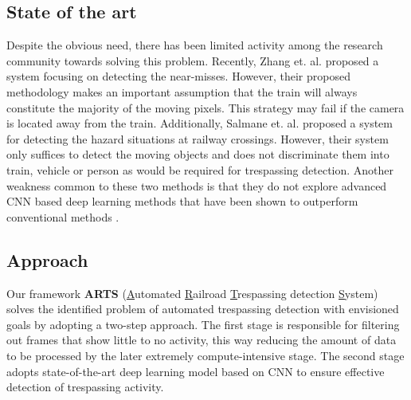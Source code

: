 \subsection{State of the art}
Despite the obvious need, there has been limited activity among the research community towards solving this problem. Recently, Zhang et. al. \cite{zhang2018automated} proposed a system focusing on detecting the near-misses. However, their proposed methodology makes an important assumption that the train will always constitute the majority of the moving pixels. This strategy may fail if the camera is located away from the train. Additionally, Salmane et. al. \cite{salmane2015video} proposed a system for detecting the hazard situations at railway crossings. However, their system only suffices to detect the moving objects and does not discriminate them into train, vehicle or person as would be required for trespassing detection. Another weakness common to these two methods is that they do not explore advanced CNN based deep learning methods that have been shown to outperform conventional methods \cite{krizhevsky2012imagenet}. 

\subsection{Approach}
Our framework \textbf{ARTS} (\underline{A}utomated \underline{R}ailroad \underline{T}respassing detection \underline{S}ystem) solves the identified problem of automated trespassing detection with envisioned goals by adopting a two-step approach. The first stage is responsible for filtering out frames that show little to no activity, this way reducing the amount of data to be processed by the later extremely compute-intensive stage. The second stage adopts state-of-the-art deep learning model based on CNN to ensure effective detection of trespassing activity.
